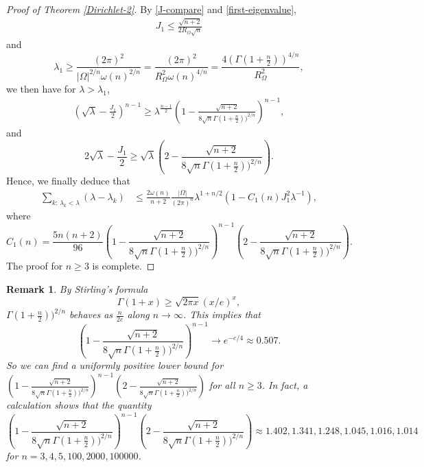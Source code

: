 \documentclass[11pt,twoside, leqno]{article}
\newtheorem{rem}[thm]{Remark}
\numberwithin{equation}{section}
\begin{document}
\begin{proof}[Proof of Theorem \ref{Dirichlet-2}]
By \eqref{J-compare} and \eqref{first-eigenvalue},
\begin{align*}
J_1\le \frac{\sqrt{n+2}}{2R_\Omega\sqrt n}
\end{align*}
and
\begin{equation*}
\lambda_1 \ge  \frac{(2\pi)^2}{|\Omega|^{2/n}\omega(n)^{2/n}}=\frac{(2\pi)^2}{R_\Omega^2\omega(n)^{4/n}}= \frac{4 (\Gamma(1+\frac n2))^{4/n}}{R_\Omega^2},
\end{equation*}
we then have for $\lambda>\lambda_1$,
\begin{align*}
(\sqrt\lambda-\frac{J_1}2)^{n-1}\ge \lambda^{\frac{n-1}{2}}\left(1-\frac{\sqrt{n+2}}{8\sqrt n \Gamma(1+\frac n2))^{2/n}}\right)^{n-1},
\end{align*}
and
$$2\sqrt\lambda-\frac{J_1}{2}\ge \sqrt\lambda\left(2-\frac{\sqrt{n+2}}{8\sqrt n \Gamma(1+\frac n2))^{2/n}}\right).$$
Hence, we finally deduce that
\begin{align*}
\sum_{k:\,\lambda_k<\lambda}(\lambda-\lambda_k)&\le   \frac{ 2\omega(n)}{n+2} \frac{|\Omega|}{(2\pi)^{n}}\lambda^{1+n/2}\left(1-C_1(n)J_1^2\lambda^{-1}\right),
\end{align*}
where
$$C_1(n)=\frac{5n(n+2)}{96}\left(1-\frac{\sqrt{n+2}}{8\sqrt n \Gamma(1+\frac n2))^{2/n}}\right)^{n-1}\left(2-\frac{\sqrt{n+2}}{8\sqrt n \Gamma(1+\frac n2))^{2/n}}\right).$$
The proof for $n\ge 3$ is complete.
\end{proof}
\begin{rem}\label{remark-1}\rm
By  Stirling's formula
$$\Gamma(1+x)\ge \sqrt{2\pi x}(x/e)^x,$$
$\Gamma(1+\frac n2))^{2/n}$ behaves as $\frac{n}{2e}$ along $n\to\infty$.
This implies that
$$\left(1-\frac{\sqrt{n+2}}{8\sqrt n \Gamma(1+\frac n2))^{2/n}}\right)^{n-1}\to e^{-e/4} \approx 0.507.$$
So we can find a uniformly positive lower bound  for $\left(1-\frac{\sqrt{n+2}}{8\sqrt n \Gamma(1+\frac n2))^{2/n}}\right)^{n-1}\left(2-\frac{\sqrt{n+2}}{8\sqrt n \Gamma(1+\frac n2))^{2/n}}\right)$
for all $n\ge 3$. In fact, a calculation shows that the quantity
$$\left(1-\frac{\sqrt{n+2}}{8\sqrt n \Gamma(1+\frac n2))^{2/n}}\right)^{n-1}\left(2-\frac{\sqrt{n+2}}{8\sqrt n \Gamma(1+\frac n2))^{2/n}}\right)\approx 1.402, 1.341,1.248, 1.045, 1.016, 1.014$$
for $n=3,4,5, 100, 2000, 100000$.
\end{rem}
\end{document}
